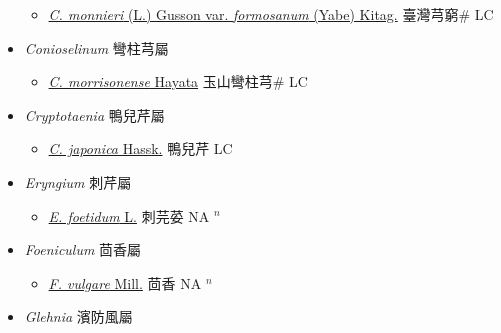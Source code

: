 \begin{itemize}
  \begin{itemize}
        \item[] \href{http://www.theplantlist.org/tpl1.1/search?q=Cnidium+monnieri+var.+formosanum}{\textit{C. monnieri} (L.) Gusson var. \textit{formosanum} (Yabe) Kitag.}   臺灣芎窮\# LC
  \end{itemize}
 \item[] \textit{Conioselinum} 彎柱芎屬
                    
  \begin{itemize}
        \item[] \href{http://www.theplantlist.org/tpl1.1/search?q=Conioselinum+morrisonense}{\textit{C. morrisonense} Hayata}   玉山彎柱芎\# LC
  \end{itemize}
 \item[] \textit{Cryptotaenia} 鴨兒芹屬
                    
  \begin{itemize}
        \item[] \href{http://www.theplantlist.org/tpl1.1/search?q=Cryptotaenia+japonica}{\textit{C. japonica} Hassk.}   鴨兒芹 LC
  \end{itemize}
 \item[] \textit{Eryngium} 刺芹屬
                    
  \begin{itemize}
        \item[] \href{http://www.theplantlist.org/tpl1.1/search?q=Eryngium+foetidum}{\textit{E. foetidum} L.}   刺芫荽 NA $^n$
  \end{itemize}
 \item[] \textit{Foeniculum} 茴香屬
                    
  \begin{itemize}
        \item[] \href{http://www.theplantlist.org/tpl1.1/search?q=Foeniculum+vulgare}{\textit{F. vulgare} Mill.}   茴香 NA $^n$
  \end{itemize}
 \item[] \textit{Glehnia} 濱防風屬
                    

\end{itemize}
